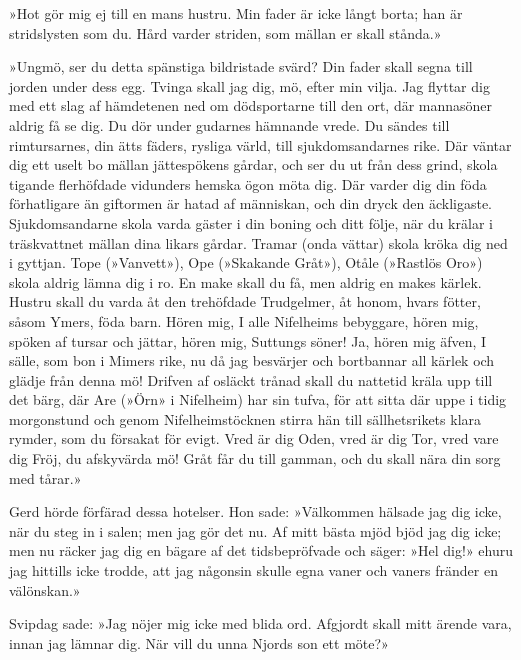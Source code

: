 »Hot gör mig ej till en mans hustru. Min fader är icke långt borta; han
är stridslysten som du. Hård varder striden, som mällan er skall
stånda.»

»Ungmö, ser du detta spänstiga bildristade svärd? Din fader skall segna
till jorden under dess egg. Tvinga skall jag dig, mö, efter min vilja.
Jag flyttar dig med ett slag af hämdetenen ned om dödsportarne till den
ort, där mannasöner aldrig få se dig. Du dör under gudarnes hämnande
vrede. Du sändes till rimtursarnes, din ätts fäders, rysliga värld, till
sjukdomsandarnes rike. Där väntar dig ett uselt bo mällan jättespökens
gårdar, och ser du ut från dess grind, skola tigande flerhöfdade
vidunders hemska ögon möta dig. Där varder dig din föda förhatligare än
giftormen är hatad af människan, och din dryck den äckligaste.
Sjukdomsandarne skola varda gäster i din boning och ditt följe, när du
krälar i träskvattnet mällan dina likars gårdar. Tramar (onda vättar)
skola kröka dig ned i gyttjan. Tope (»Vanvett»), Ope (»Skakande Gråt»),
Otåle (»Rastlös Oro») skola aldrig lämna dig i ro. En make skall du få,
men aldrig en makes kärlek. Hustru skall du varda åt den trehöfdade
Trudgelmer, åt honom,
\protect\hypertarget{lb1625905.xhtmlux5cux23start135}{}{}\protect\hypertarget{lb1625905.xhtmlux5cux23start135-a}{}{}\protect\hypertarget{lb1625905.xhtmlux5cux23start135-b}{}{}\protect\hypertarget{lb1625905.xhtmlux5cux23start135-c}{}{}\protect\hypertarget{lb1625905.xhtmlux5cux23start135-d}{}{}
hvars fötter, såsom Ymers, föda barn. Hören mig, I alle Nifelheims
bebyggare, hören mig, spöken af tursar och jättar, hören mig, Suttungs
söner! Ja, hören mig äfven, I sälle, som bon i Mimers rike, nu då jag
besvärjer och bortbannar all kärlek och glädje från denna mö! Drifven af
osläckt trånad skall du nattetid kräla upp till det bärg, där Are (»Örn»
i Nifelheim) har sin tufva, för att sitta där uppe i tidig morgonstund
och genom Nifelheimstöcknen stirra hän till sällhetsrikets klara rymder,
som du försakat för evigt. Vred är dig Oden, vred är dig Tor, vred vare
dig Fröj, du afskyvärda mö! Gråt får du till gamman, och du skall nära
din sorg med tårar.»

Gerd hörde förfärad dessa hotelser. Hon sade: »Välkommen hälsade jag dig
icke, när du steg in i salen; men jag gör det nu. Af mitt bästa mjöd
bjöd jag dig icke; men nu räcker jag dig en bägare af det tidsbepröfvade
och säger: »Hel dig!» ehuru jag hittills icke trodde, att jag någonsin
skulle egna vaner och vaners fränder en välönskan.»

Svipdag sade: »Jag nöjer mig icke med blida ord. Afgjordt skall mitt
ärende vara, innan jag lämnar dig. När vill du unna Njords son ett
möte?»

